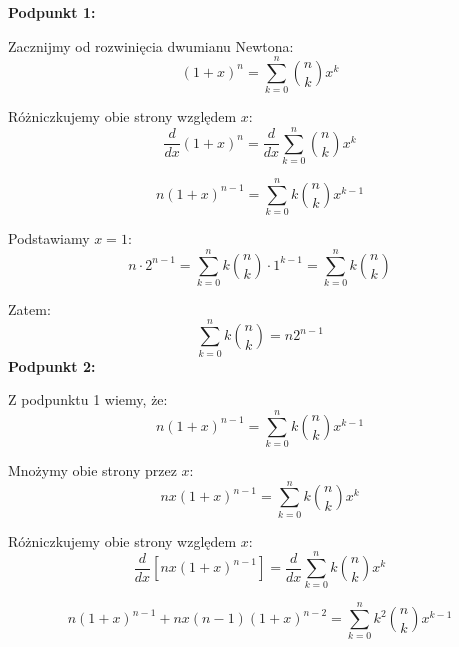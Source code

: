 \documentclass{mwart}
\begin{document}
\begin{mdframed}
    \begin{enumerate}
        \textbf{Podpunkt 1:}

        Zacznijmy od rozwinięcia dwumianu Newtona:
        \begin{equation}
        (1+x)^n = \sum_{k=0}^{n} \binom{n}{k} x^k
        \end{equation}

        Różniczkujemy obie strony względem $x$:
        \begin{equation}
        \frac{d}{dx}(1+x)^n = \frac{d}{dx}\sum_{k=0}^{n} \binom{n}{k} x^k
        \end{equation}

        \begin{equation}
        n(1+x)^{n-1} = \sum_{k=0}^{n} k \binom{n}{k} x^{k-1}
        \end{equation}

        Podstawiamy $x = 1$:
        \begin{equation}
        n \cdot 2^{n-1} = \sum_{k=0}^{n} k \binom{n}{k} \cdot 1^{k-1} = \sum_{k=0}^{n} k \binom{n}{k}
        \end{equation}

        Zatem:
        \begin{equation}
        \boxed{\sum_{k=0}^{n} k \binom{n}{k} = n2^{n-1}}
        \end{equation}
        \newline
        \textbf{Podpunkt 2:}

        Z podpunktu 1 wiemy, że:
        \begin{equation}
        n(1+x)^{n-1} = \sum_{k=0}^{n} k \binom{n}{k} x^{k-1}
        \end{equation}

        Mnożymy obie strony przez $x$:
        \begin{equation}
        nx(1+x)^{n-1} = \sum_{k=0}^{n} k \binom{n}{k} x^k
        \end{equation}

        Różniczkujemy obie strony względem $x$:
        \begin{equation}
        \frac{d}{dx}[nx(1+x)^{n-1}] = \frac{d}{dx}\sum_{k=0}^{n} k \binom{n}{k} x^k
        \end{equation}

        \begin{equation}
        n(1+x)^{n-1} + nx(n-1)(1+x)^{n-2} = \sum_{k=0}^{n} k^2 \binom{n}{k} x^{k-1}
        \end{equation}


\end{enumerate}
\end{mdframed}
\end{document}
